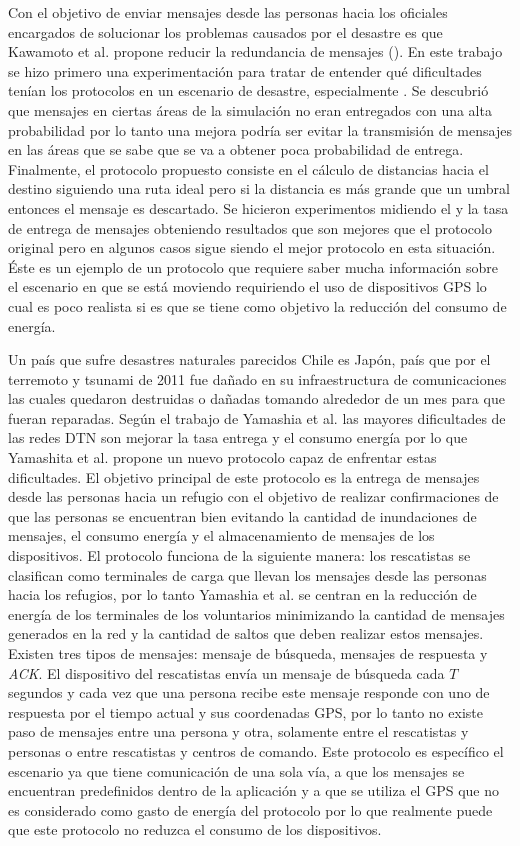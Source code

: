Con el objetivo de enviar mensajes desde las personas hacia los oficiales
encargados de solucionar los problemas causados por el desastre es que Kawamoto
et al. \cite{Kawamoto2015} propone reducir la redundancia de mensajes
(\overhead). En este trabajo se hizo primero una experimentación para tratar de
entender qué dificultades tenían los protocolos en un escenario de desastre,
especialmente \epidemic. Se descubrió que mensajes en ciertas áreas de la
simulación no eran entregados con una alta probabilidad por lo tanto una mejora
podría ser evitar la transmisión de mensajes en las áreas que se sabe que se va
a obtener poca probabilidad de entrega. Finalmente, el protocolo propuesto
consiste en el cálculo de distancias hacia el destino siguiendo una ruta ideal
pero si la distancia es más grande que un umbral entonces el mensaje es
descartado. Se hicieron experimentos midiendo el \overhead{} y la tasa de
entrega de mensajes obteniendo resultados que son mejores que el protocolo
original pero en algunos casos \epidemic{} sigue siendo el mejor protocolo en
esta situación.  Éste es un ejemplo de un protocolo que requiere saber mucha
información sobre el escenario en que se está moviendo requiriendo el uso de
dispositivos GPS lo cual es poco realista si es que se tiene como objetivo la
reducción del consumo de energía. 

Un país que sufre desastres naturales parecidos Chile es Japón, país que por el
terremoto y tsunami de 2011 fue dañado en su infraestructura de comunicaciones
las cuales quedaron destruidas o dañadas tomando alrededor de un mes para que
fueran reparadas. Según el trabajo de Yamashia et al. \cite{Yamashita2015} las
mayores dificultades de las redes DTN son mejorar la tasa entrega y el consumo
energía por lo que Yamashita et al. propone un nuevo protocolo capaz de
enfrentar estas dificultades.  El objetivo principal de este protocolo es la
entrega de mensajes desde las personas hacia un refugio con el objetivo de
realizar confirmaciones de que las personas se encuentran bien evitando la
cantidad de inundaciones de mensajes, el consumo energía y el almacenamiento de
mensajes de los dispositivos. El protocolo funciona de la siguiente manera: los
rescatistas se clasifican como terminales de carga que llevan los mensajes desde
las personas hacia los refugios, por lo tanto Yamashia et al. se centran en la
reducción de energía de los terminales de los voluntarios minimizando la
cantidad de mensajes generados en la red y la cantidad de saltos que deben
realizar estos mensajes.  Existen tres tipos de mensajes: mensaje de búsqueda,
mensajes de respuesta y \textit{ACK}. El dispositivo del rescatistas envía un
mensaje de búsqueda cada $T$ segundos y cada vez que una persona recibe este
mensaje responde con uno de respuesta por el tiempo actual y sus coordenadas
GPS, por lo tanto no existe paso de mensajes entre una persona y otra, solamente
entre el rescatistas y personas o entre rescatistas y centros de comando. Este
protocolo es específico el escenario ya que tiene comunicación de una sola vía,
a que los mensajes se encuentran predefinidos dentro de la aplicación y a que se
utiliza el GPS que no es considerado como gasto de energía del protocolo por lo
que realmente puede que este protocolo no reduzca el consumo de los
dispositivos.

